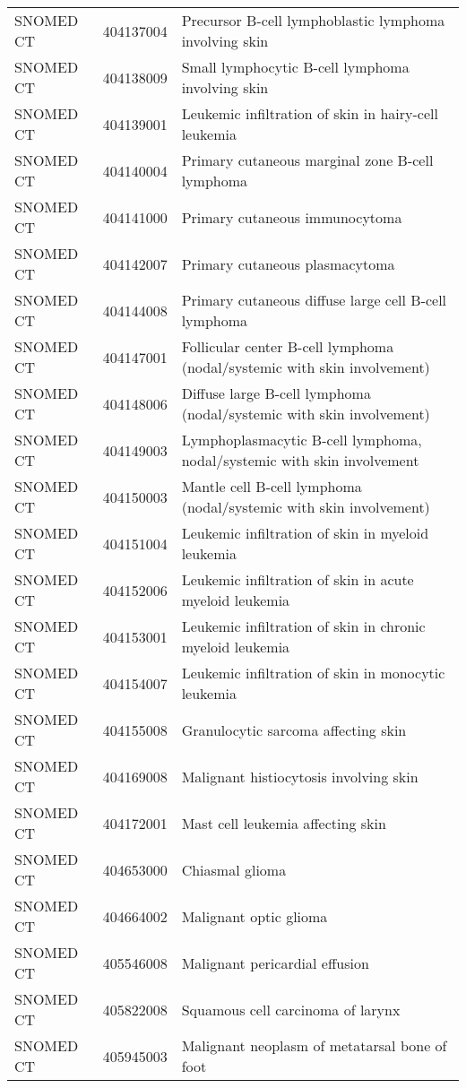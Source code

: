 \begin{longtable}{p{}p{}p{}}
  SNOMED CT & 404137004 & Precursor B-cell lymphoblastic lymphoma involving skin \\ 
  SNOMED CT & 404138009 & Small lymphocytic B-cell lymphoma involving skin \\ 
  SNOMED CT & 404139001 & Leukemic infiltration of skin in hairy-cell leukemia \\ 
  SNOMED CT & 404140004 & Primary cutaneous marginal zone B-cell lymphoma \\ 
  SNOMED CT & 404141000 & Primary cutaneous immunocytoma \\ 
  SNOMED CT & 404142007 & Primary cutaneous plasmacytoma \\ 
  SNOMED CT & 404144008 & Primary cutaneous diffuse large cell B-cell lymphoma \\ 
  SNOMED CT & 404147001 & Follicular center B-cell lymphoma (nodal/systemic with skin involvement) \\ 
  SNOMED CT & 404148006 & Diffuse large B-cell lymphoma (nodal/systemic with skin involvement) \\ 
  SNOMED CT & 404149003 & Lymphoplasmacytic B-cell lymphoma, nodal/systemic with skin involvement \\ 
  SNOMED CT & 404150003 & Mantle cell B-cell lymphoma (nodal/systemic with skin involvement) \\ 
  SNOMED CT & 404151004 & Leukemic infiltration of skin in myeloid leukemia \\ 
  SNOMED CT & 404152006 & Leukemic infiltration of skin in acute myeloid leukemia \\ 
  SNOMED CT & 404153001 & Leukemic infiltration of skin in chronic myeloid leukemia \\ 
  SNOMED CT & 404154007 & Leukemic infiltration of skin in monocytic leukemia \\ 
  SNOMED CT & 404155008 & Granulocytic sarcoma affecting skin \\ 
  SNOMED CT & 404169008 & Malignant histiocytosis involving skin \\ 
  SNOMED CT & 404172001 & Mast cell leukemia affecting skin \\ 
  SNOMED CT & 404653000 & Chiasmal glioma \\ 
  SNOMED CT & 404664002 & Malignant optic glioma \\ 
  SNOMED CT & 405546008 & Malignant pericardial effusion \\ 
  SNOMED CT & 405822008 & Squamous cell carcinoma of larynx \\ 
  SNOMED CT & 405945003 & Malignant neoplasm of metatarsal bone of foot \\ 

\end{longtable}
